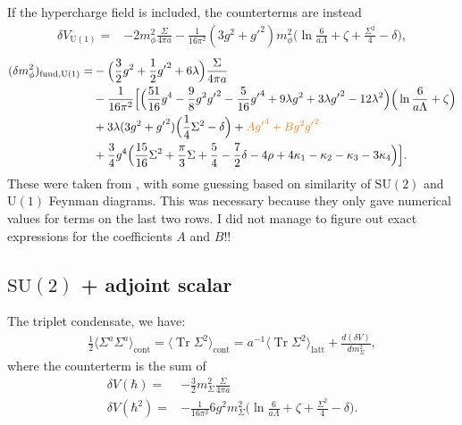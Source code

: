 \documentclass[11pt,a4paper]{article}
\newcommand\Tr{\operatorname{Tr}}
\newcommand\gr[1]{\mathrm{#1}}%
\newcommand\lauri[1]{{\color{myorange}#1}}
\begin{document}
If the hypercharge field is included, the counterterms are instead 
\begin{align}
\delta V_{\gr{U(1)}} =& - 2 m^2_\phi \frac{\Sigma}{4\pi a} - \frac{1}{16\pi^2} (3g^2 + {g'}^2) m^2_\phi \Big( \ln \frac{6}{a \Lambda} +\zeta + \frac{\Sigma^2}{4} - \delta \Big),
\end{align}
\begin{align}
(\delta m^2_\phi)_{\text{fund}, \gr{U(1)}} =& -\Big(\frac32 g^2 + \frac12 {g'}^2 + 6\lambda\Big) \frac{\Sigma}{4\pi a} \nonumber \\
&- \frac{1}{16\pi^2}\Big[ \Big( \frac{51}{16}g^4 - \frac98 g^2 {g'}^2 - \frac{5}{16} {g'}^4 + 9\lambda g^2 + 3\lambda {g'}^2 - 12\lambda^2 \Big)\Big( \ln \frac{6}{a\Lambda}+\zeta \Big) \nonumber \\ 
& + 3\lambda(3g^2 + {g'}^2)  \Big( \frac14 \Sigma^2 - \delta \Big) + \lauri{A {g'}^4 + B g^2 {g'}^2 }\nonumber \\
& + \frac34 g^4 \Big( \frac{15}{16}\Sigma^2 + \frac{\pi}{3} \Sigma + \frac54 - \frac72 \delta - 4\rho +4\kappa_1 - \kappa_2 - \kappa_3 - 3\kappa_4  \Big) \Big].
\end{align}
These were taken from \cite{Kajantie:1996qd}, with some guessing based on similarity of $\gr{SU(2)}$ and $\gr{U(1)}$ Feynman diagrams. This was necessary because they only gave numerical values for terms on the last two rows. \lauri{I did not manage to figure out exact expressions for the coefficients $A$ and $B$!!}

\subsection{$\gr{SU(2)}$ + adjoint scalar}

The triplet condensate, we have:
\begin{align}
\frac12 \langle \Sigma^a\Sigma^a\rangle_\text{cont} = \langle\Tr \Sigma^2\rangle_\text{cont} = a^{-1} \langle \Tr \Sigma^2 \rangle_\text{latt} + \frac{d(\delta V)}{dm^2_\Sigma},
\end{align}
where the counterterm is the sum of
\begin{align}
\label{eq:vacuumCT_adj}
\delta V(\hbar) =& -\frac32 m^2_\Sigma \frac{\Sigma}{4\pi a} \nonumber \\
\delta V(\hbar^2) =& -\frac{1}{16\pi^2} 6g^2 m^2_\Sigma \Big( \ln \frac{6}{a \Lambda} +\zeta + \frac{\Sigma^2}{4} - \delta\Big).
\end{align}
\end{document}
